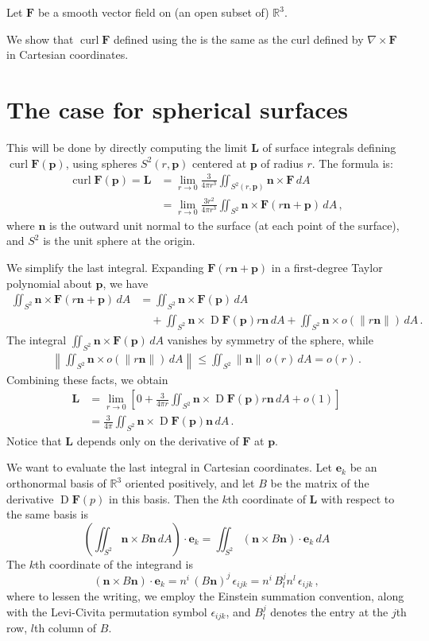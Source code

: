 \documentclass[12pt]{article}
\newcommand{\real}{\mathbb{R}}
\providecommand{\norm}[1]{\lVert#1\rVert}
\providecommand{\normW}[1]{\left\lVert#1\right\rVert}
\DeclareMathOperator{\D}{D}
\newcommand{\ve}{\mathbf{e}}
\newcommand{\vF}{\mathbf{F}}
\newcommand{\vL}{\mathbf{L}}
\newcommand{\vn}{\mathbf{n}}
\newcommand{\vp}{\mathbf{p}}
\newcommand{\DF}{\D \mathbf{F}}
\newcommand{\cross}{\times}
\DeclareMathOperator{\curl}{curl}
\begin{document}
Let $\vF$ be a smooth vector field on (an open subset of) $\real^3$.

We show that $\curl \vF$ defined using the 
is the same as the curl defined
by $\nabla \cross \vF$ in Cartesian coordinates.

\section*{The case for spherical surfaces}
This will be done by directly computing the limit $\vL$ of surface 
integrals defining $\curl \vF(\vp)$,
using spheres $S^2(r, \vp)$ centered at $\vp$ of radius $r$.  The formula is:
\begin{align*}
\curl \vF(\vp) = \vL &= \lim_{r \to 0} \frac{3}{4 \pi r^3} \iint_{S^2(r, \vp)} \vn \cross \vF \, dA \\
&= \lim_{r \to 0} \frac{3 r^2}{4\pi r^3} 
\iint_{S^2} \vn \cross \vF(r\vn + \vp) \, dA\,,
\end{align*}
where $\vn$ is the outward unit normal to the surface (at each point of the surface), and 
$S^2$ is the unit sphere at the origin.

We simplify the last integral.  
Expanding $\vF(r\vn + \vp)$
in a first-degree Taylor polynomial about $\vp$, we have
\begin{align*}
\iint_{S^2} \vn \cross \vF(r\vn + \vp) \, dA &=
\iint_{S^2} \vn \cross \vF(\vp) \, dA \\
& \quad + \iint_{S^2} \vn \cross \DF(\vp)r\vn \, dA + \iint_{S^2} \vn \cross o(\norm{r\vn})  \, dA\,.
\end{align*}
The integral $\iint_{S^2} \vn \cross \vF(\vp) \, dA$ 
vanishes by symmetry of the sphere,
while
\begin{align*}
\normW{ \iint_{S^2} \vn \cross o(\norm{r\vn}) \, dA }
\leq \iint_{S^2} \norm{\vn} \, o(r) \, dA = o(r)\,.
\end{align*}
Combining these facts, we obtain
\begin{align*}
\vL &= \lim_{r \to 0} \left[ 0 + \frac{3}{4\pi r} \iint_{S^2} \vn \times \DF(\vp) r\vn \, dA  + o(1) \right]\\
&= \frac{3}{4\pi} \iint_{S^2} \vn \times \DF(\vp) \vn \, dA\,.
\end{align*}
Notice that $\vL$ depends only on the derivative of $\vF$
at $\vp$.

We want to evaluate the last integral in Cartesian coordinates.
Let $\ve_k$ be an orthonormal basis of $\real^3$
oriented positively, and let $B$ be the matrix of the derivative
$\DF(p)$ in this basis.
Then the $k$th coordinate of $\vL$ with respect to the
same basis
is 
\[
\left(\iint_{S^2} \vn \cross B\vn \, dA \right) \cdot \ve_k 
= \iint_{S^2} (\vn \cross B\vn) \cdot \ve_k \, dA
\]
The $k$th coordinate of the integrand is
\[
(\vn \cross B\vn) \cdot \ve_k =
n^i \,  (B\vn)^j \, \epsilon_{ijk}
= n^i \, B^j_l n^l \, \epsilon_{ijk}\,,
\]
where to lessen the writing, we employ
the Einstein summation convention, along
with the Levi-Civita permutation symbol $\epsilon_{ijk}$, and $B^j_l$
denotes the entry at the $j$th row, $l$th column of $B$.
\end{document}
